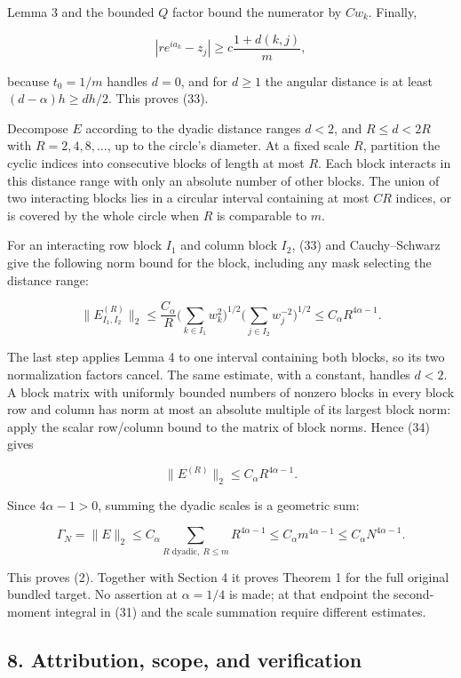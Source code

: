\documentclass[10pt,a4paper]{article}
\begin{document}
Lemma 3 and the bounded \(Q\) factor bound the numerator by \(Cw_k\).
Finally,

\nopagebreak[4]
\[|re^{ia_k}-z_j|\ge c\frac{1+d(k,j)}m,\]

because \(t_0=1/m\) handles \(d=0\), and for \(d\ge1\) the angular
distance is at least \((d-\alpha)h\ge dh/2\). This proves (33).

Decompose \(E\) according to the dyadic distance ranges \(d<2\), and
\(R\le d<2R\) with \(R=2,4,8,\ldots\), up to the circle's diameter. At a
fixed scale \(R\), partition the cyclic indices into consecutive blocks
of length at most \(R\). Each block interacts in this distance range
with only an absolute number of other blocks. The union of two
interacting blocks lies in a circular interval containing at most \(CR\)
indices, or is covered by the whole circle when \(R\) is comparable to
\(m\).

For an interacting row block \(I_1\) and column block \(I_2\), (33) and
Cauchy--Schwarz give the following norm bound for the block, including
any mask selecting the distance range:

\nopagebreak[4]
\[\|E^{(R)}_{I_1,I_2}\|_2
 \le\frac{C_\alpha}{R}
       \Big(\sum_{k\in I_1}w_k^2\Big)^{1/2}
       \Big(\sum_{j\in I_2}w_j^{-2}\Big)^{1/2}
 \le C_\alpha R^{4\alpha-1}. \tag{34}\]

The last step applies Lemma 4 to one interval containing both blocks, so
its two normalization factors cancel. The same estimate, with a
constant, handles \(d<2\). A block matrix with uniformly bounded numbers
of nonzero blocks in every block row and column has norm at most an
absolute multiple of its largest block norm: apply the scalar row/column
bound to the matrix of block norms. Hence (34) gives

\nopagebreak[4]
\[\|E^{(R)}\|_2\le C_\alpha R^{4\alpha-1}.\]

Since \(4\alpha-1>0\), summing the dyadic scales is a geometric sum:

\nopagebreak[4]
\[\Gamma_N=\|E\|_2
 \le C_\alpha\sum_{R\text{ dyadic},\ R\le m}R^{4\alpha-1}
 \le C_\alpha m^{4\alpha-1}
 \le C_\alpha N^{4\alpha-1}. \tag{35}\]

This proves (2). Together with Section 4 it proves Theorem 1 for the
full original bundled target. No assertion at \(\alpha=1/4\) is made; at
that endpoint the second-moment integral in (31) and the scale summation
require different estimates.

\subsection{8. Attribution, scope, and
verification}\label{attribution-scope-and-verification}
\end{document}
